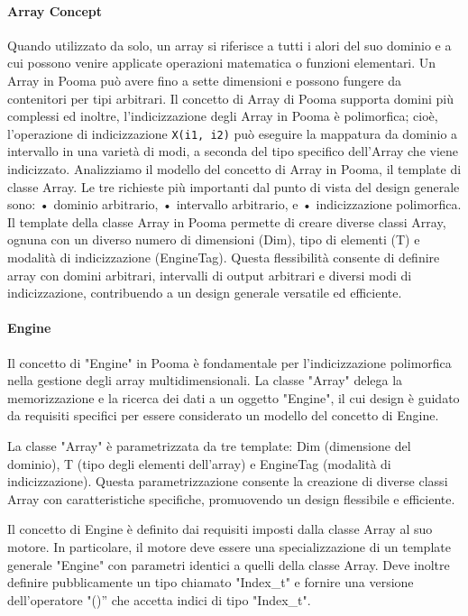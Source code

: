 \documentclass[11pt]{article}
\begin{document}
\begin{multicols*}{2}[\columnsep=1cm]
    \paragraph{Array Concept}
    Quando utilizzato da solo, un array si riferisce a tutti i alori del suo dominio e a cui possono venire applicate operazioni matematica o funzioni elementari.
    Un Array in Pooma può avere fino a sette dimensioni e possono fungere da contenitori per tipi arbitrari. 
    Il concetto di Array di Pooma supporta domini più complessi ed inoltre, l'indicizzazione degli Array in Pooma è polimorfica; cioè, l'operazione di indicizzazione \texttt{X(i1, i2)} può eseguire la mappatura da dominio a intervallo in una varietà di modi, a seconda del tipo specifico dell'Array che viene indicizzato.
    Analizziamo il modello del concetto di Array in Pooma, il template di classe Array.
    Le tre richieste più importanti dal punto di vista del design generale sono:
    • dominio arbitrario,
    • intervallo arbitrario, e
    • indicizzazione polimorfica.
    Il template della classe Array in Pooma permette di creare diverse classi Array, ognuna con un diverso numero di dimensioni (Dim), tipo di elementi (T) e modalità di indicizzazione (EngineTag). Questa flessibilità consente di definire array con domini arbitrari, intervalli di output arbitrari e diversi modi di indicizzazione, contribuendo a un design generale versatile ed efficiente.
    
    \paragraph{Engine}
    Il concetto di "Engine" in Pooma è fondamentale per l'indicizzazione polimorfica nella gestione degli array multidimensionali. La classe "Array" delega la memorizzazione e la ricerca dei dati a un oggetto "Engine", il cui design è guidato da requisiti specifici per essere considerato un modello del concetto di Engine.

    La classe "Array" è parametrizzata da tre template: Dim (dimensione del dominio), T (tipo degli elementi dell'array) e EngineTag (modalità di indicizzazione). Questa parametrizzazione consente la creazione di diverse classi Array con caratteristiche specifiche, promuovendo un design flessibile e efficiente.

    Il concetto di Engine è definito dai requisiti imposti dalla classe Array al suo motore. In particolare, il motore deve essere una specializzazione di un template generale "Engine" con parametri identici a quelli della classe Array. Deve inoltre definire pubblicamente un tipo chiamato "Index\_t" e fornire una versione dell'operatore "()” che accetta indici di tipo "Index\_t".


\end{multicols*}
\end{document}
